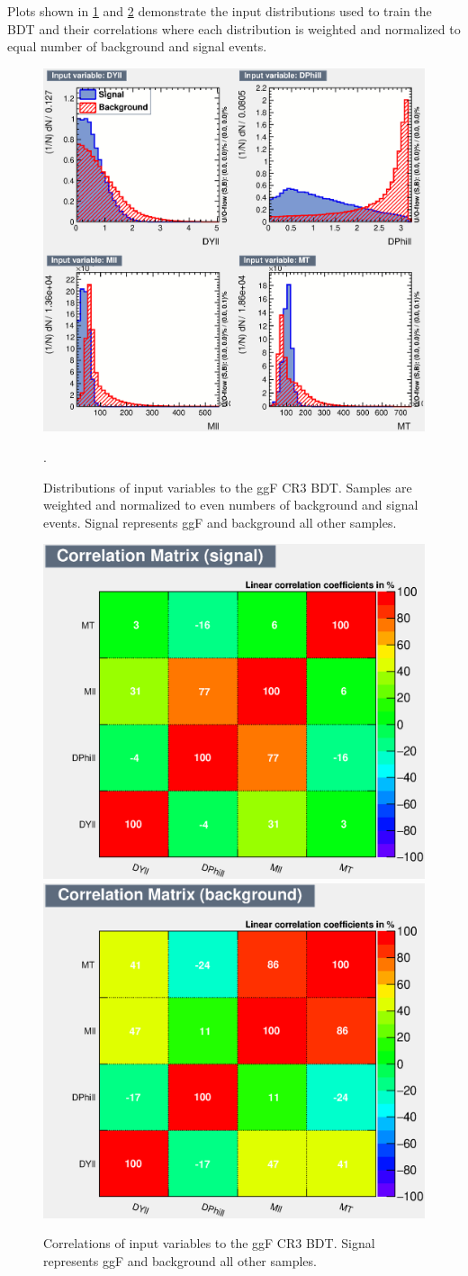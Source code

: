 Plots shown in \ref{fig:ggFCR3BDTinput} and \ref{fig:ggFCR3corrSB} demonstrate the input distributions used to train the BDT and their correlations where each distribution is weighted and normalized to equal number of background and signal events. 

\begin{figure}[!htbp]
    \centering
    \includegraphics[width=0.65\linewidth]{Pictures/ggFCR3/variables_id_c1.eps}
    \caption{Distributions of input variables to the ggF CR3 BDT. Samples are weighted and normalized to even numbers of background and signal events. Signal represents ggF and background all other samples.}.
    \label{fig:ggFCR3BDTinput}
\end{figure}
\begin{figure}[!htbp]
\centering
  \includegraphics[width=.4\linewidth]{Pictures/ggFCR3/CorrelationMatrixS.eps}
  \includegraphics[width=.4\linewidth]{Pictures/ggFCR3/CorrelationMatrixB.eps}
\caption{Correlations of input variables to the ggF CR3 BDT. Signal represents ggF and background all other samples.}
\label{fig:ggFCR3corrSB}
\end{figure}

